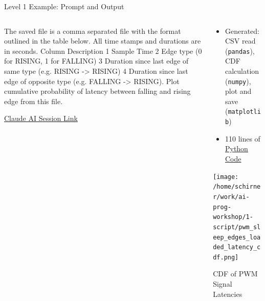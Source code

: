 \documentclass[xcolor=dvipsnames, aspectratio=169]{beamer}
\begin{document}
\begin{frame}[fragile]{Level 1 Example: Prompt and Output}
  \begin{columns}
    \begin{column}{0.6\textwidth}
    \begin{tcolorbox}[enhanced, colback=gray!5, colframe=gray!40, title=AI Prompt, fonttitle=\small, arc=0mm, boxrule=0.1pt]
      The saved file is a comma separated file with the format outlined in the table below. All time stamps and durations are in seconds. Column Description 1 Sample Time 2 Edge type (0 for RISING, 1 for FALLING) 3 Duration since last edge of same type (e.g. RISING -> RISING) 4 Duration since last edge of opposite type (e.g. FALLING -> RISING). Plot cumulative probability of latency between falling and rising edge from this file.      
      \end{tcolorbox}
      \small\href{https://claude.ai/share/7e11fde4-bb5e-476e-b8f3-9dad820724f5}{Claude AI Session Link}
    \end{column}
    
    \begin{column}{0.4\textwidth}
      \begin{itemize}
        \item Generated: CSV read (\texttt{pandas}), CDF calculation (\texttt{numpy}), plot and save (\texttt{matplotlib})
        \item 110 lines of \href{https://github.com/neu-ece-esl/ai-prog-workshop/blob/main/1-script/analyze_latency.py}{Python Code}
      \end{itemize}
      \texttt{[image: /home/schirner/work/ai-prog-workshop/1-script/pwm\_sleep\_edges\_loaded\_latency\_cdf.png]}
      \small\centerline{CDF of PWM Signal Latencies}
      
    \end{column}
  \end{columns}
\end{frame}
\end{document}
